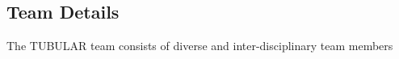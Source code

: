 \subsection{Team Details}
The TUBULAR team consists of diverse and inter-disciplinary team members 

\bigskip


